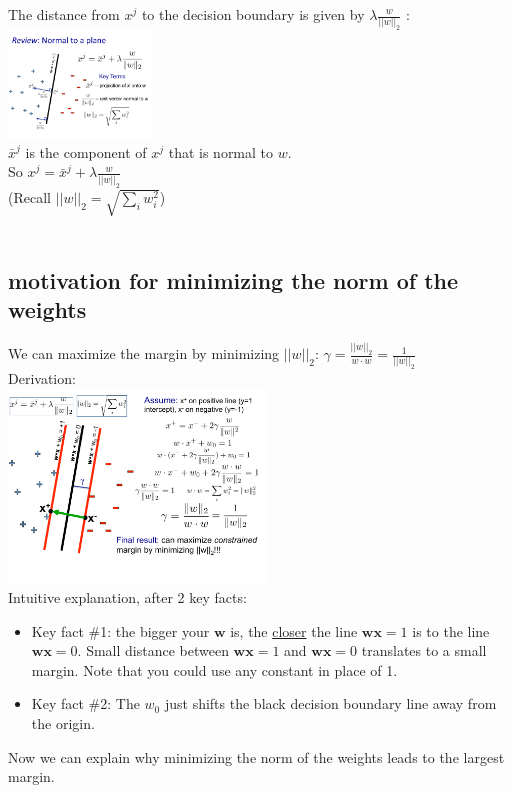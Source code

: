 
The distance from $x^j$ to the decision boundary is given by $\lambda \frac{w}{||w||_2}$ :  \hfill \\
\includegraphics[width=1.5in]{figures/svm_component_norm_to_decision_boundary.pdf}  \hfill \\
$\bar{x}^j$ is the component of $x^j$ that is normal to $w$. \hfill \\
So $x^j = \bar{x}^j + \lambda \frac{w}{||w||_2}$  \hfill \\
(Recall $||w||_2 = \sqrt{\sum_i w_i^2}$)  \hfill \\   \hfill \\

\subsection{motivation for minimizing the norm of the weights}
We can maximize the margin by minimizing $||w||_2$: 
$\gamma = \frac{||w||_2}{w \cdot w} = \frac{1}{||w||_2}$   \hfill \\
Derivation:  \hfill \\
\includegraphics[width=2.7in]{figures/svm_derivation_of_minimizing_weights.pdf} \hfill \\

Intuitive explanation, after 2 key facts:  \hfill \\
\begin{itemize}
	\item Key fact \#1: the bigger your $\bm{w}$ is, the \underline{closer} the line $\bm{w}\bm{x}=1$ is to the line $\bm{w}\bm{x} = 0$.  		Small distance between $\bm{w}\bm{x}=1$ and $\bm{w}\bm{x}=0$ translates to a small margin.  
		Note that you could use any constant in place of 1. 
	\item Key fact \#2: The $w_0$ just shifts the black decision boundary line away from the origin.  
\end{itemize}
Now we can explain why minimizing the norm of the weights leads to the largest margin. 

